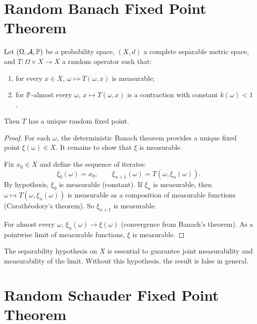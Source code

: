\section{Random Banach Fixed Point Theorem}

\begin{theorem}
\label{thm:random-fp-banach}
Let $(\Omega, \mathcal{A}, \mathbb{P})$ be a probability space, $(X, d)$ a complete separable
metric space, and $T\colon \Omega \times X \to X$ a random operator such that:
\begin{enumerate}
  \item for every $x \in X$, $\omega \mapsto T(\omega, x)$ is measurable;
  \item for $\mathbb{P}$-almost every $\omega$, $x \mapsto T(\omega, x)$ is a contraction with
    constant $k(\omega) < 1$.
\end{enumerate}
Then $T$ has a unique random fixed point.
\end{theorem}

\begin{proof}
For each $\omega$, the deterministic Banach theorem provides a unique fixed point
$\xi(\omega) \in X$. It remains to show that $\xi$ is measurable.

Fix $x_0 \in X$ and define the sequence of iterates:
\[
  \xi_0(\omega) = x_0, \qquad \xi_{n+1}(\omega) = T(\omega, \xi_n(\omega)).
\]
By hypothesis, $\xi_0$ is measurable (constant). If $\xi_n$ is measurable, then
$\omega \mapsto T(\omega, \xi_n(\omega))$ is measurable as a composition of measurable
functions (Carath\'eodory's theorem). So $\xi_{n+1}$ is measurable.

For almost every $\omega$, $\xi_n(\omega) \to \xi(\omega)$ (convergence from Banach's
theorem). As a pointwise limit of measurable functions, $\xi$ is measurable.
\end{proof}

\begin{attention}
The separability hypothesis on $X$ is essential to guarantee joint measurability and
measurability of the limit. Without this hypothesis, the result is false in general.
\end{attention}

\section{Random Schauder Fixed Point Theorem}

